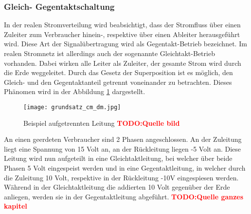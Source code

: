 \subsubsection{Gleich- Gegentaktschaltung} \label{subsubsec:gegentakt}

In der realen Stromverteilung wird beabsichtigt, dass der Stromfluss über einen Zuleiter zum Verbraucher hinein-, respektive über einen Ableiter herausgeführt wird. 
Diese Art der Signalübertragung wird als Gegentakt-Betrieb bezeichnet. Im realen Stromnetz ist allerdings auch der sogenannte Gleichtakt-Betrieb vorhanden. Dabei wirken alle Leiter als Zuleiter, der gesamte Strom wird durch die Erde weggeleitet. Durch das Gesetz der Superposition ist es möglich, den Gleich- und den Gegentaktanteil getrennt voneinander zu betrachten. Dieses Phänomen wird in der Abbildung \ref{fig:auftrennen_der_leitung} dargestellt.  

\begin{figure}[H]
	\centering
	\texttt{[image: grundsatz\_cm\_dm.jpg]}
	\caption{Beispiel aufgetrennten Leitung \textcolor{red}{\textbf{TODO:Quelle bild}}  }
	\label{fig:auftrennen_der_leitung}
\end{figure} 


An einen geerdeten Verbraucher sind 2 Phasen angeschlossen. An der Zuleitung liegt eine Spannung von 15 Volt an, an der Rückleitung liegen -5 Volt an. Diese Leitung wird nun aufgeteilt in eine Gleichtaktleitung, bei welcher über beide Phasen 5 Volt eingespeist werden und in eine Gegentaktleitung, in welcher durch die Zuleitung 10 Volt, respektive in der Rückleitung -10V eingespiesen werden. Während in der Gleichtaktleitung die addierten 10 Volt gegenüber der Erde anliegen, werden sie in der Gegentaktleitung abgeführt. \textcolor{red}{\textbf{TODO:Quelle ganzes kapitel}}


\newpage




